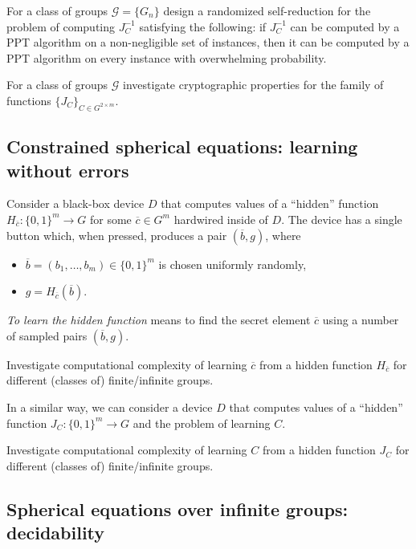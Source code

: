 \documentclass{jgcc}
\def\ovb{{\overline{b}}}
\def\ovc{{\overline{c}}}
\def\CG{{\mathcal G}}
\begin{document}
\begin{prob}\label{pr:pr61}
For a class of groups $\CG=\{G_n\}$ design a randomized self-reduction
for the problem of computing $J_C^{-1}$ 
satisfying the following:
if $J_C^{-1}$ can be computed by a PPT algorithm on a non-negligible
set of instances, then it 
can be computed by a PPT algorithm on every instance 
with overwhelming probability.
\end{prob}


\begin{prob}\label{pr:pr6}
For a class of groups $\CG$
investigate cryptographic properties 
for the family of functions $\{J_C\}_{C\in G^{2\times m}}$.
\end{prob}

\subsection{Constrained spherical equations: learning without errors}

Consider a black-box device $D$ that computes values of a ``hidden'' function
$H_\ovc\colon \{0,1\}^m\to G$ for some $\ovc\in G^m$
hardwired inside of $D$. The device has a single button
which, when pressed, produces a pair $(\ovb,g)$, where
\begin{itemize}
\item 
$\ovb=(b_1,\dots,b_m)\in\{0,1\}^m$ is chosen uniformly randomly,
\item 
$g=H_\ovc(\ovb)$.
\end{itemize}
\emph{To learn the hidden function} means to find 
the secret element $\ovc$ using a number of sampled pairs $(\ovb,g)$.

\begin{prob}
Investigate computational complexity of learning $\ovc$ 
from a hidden function $H_\ovc$
for different (classes of) finite/infinite groups.
\end{prob}

In a similar way, we can consider a device $D$ that computes 
values of a ``hidden'' function $J_C\colon \{0,1\}^m\to G$
and the problem of learning $C$.

\begin{prob}
Investigate computational complexity of learning $C$ 
from a hidden function $J_C$
for different (classes of) finite/infinite groups.
\end{prob}



\subsection{Spherical equations over infinite groups: decidability}
\end{document}
